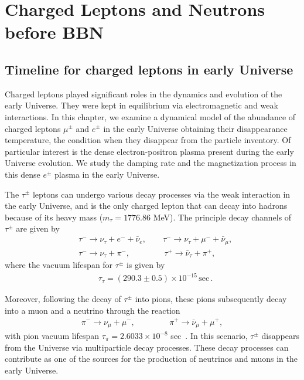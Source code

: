 \section{Charged Leptons and Neutrons before BBN} 
\subsection{Timeline for charged leptons in early Universe}\label{Electron}
Charged leptons played significant roles in the dynamics and evolution of the early Universe. They were kept in equilibrium via electromagnetic and weak interactions.  In this chapter, we examine a dynamical model of the abundance of charged leptons $\mu^\pm$ and $e^\pm$ in the early Universe obtaining their disappearance temperature, the condition when they disappear from the particle inventory. Of particular interest is the dense electron-positron plasma present during the early Universe evolution. We study the damping rate and the magnetization process in this dense $e^\pm$ plasma in the early Universe.

The $\tau^\pm$ leptons can undergo various decay processes via the weak interaction in the early Universe, and is the only charged lepton that can decay into hadrons because of its heavy mass ($m_\tau=1776.86$ MeV). The principle decay channels of $\tau^\pm$ are given by
\begin{align}
&\tau^-\rightarrow\nu_\tau+e^-+\bar{\nu}_e,\qquad \tau^-\rightarrow\nu_\tau+\mu^-+\bar{\nu}_\mu,\\
&\tau^-\rightarrow\nu_\tau+\pi^-,\qquad\qquad\,\tau^+\rightarrow\bar{\nu}_\tau+\pi^+,
\end{align}
 where the vacuum lifespan for $\tau^\pm$ is given by ~\cite{ParticleDataGroup:2022pth}
\begin{align}
&\tau_{\tau}=(290.3\pm0.5)\times10^{-15}\,\mathrm{sec}\,.
\end{align}

Moreover, following the decay of $\tau^\pm$ into pions, these pions subsequently decay into a muon and a neutrino through the reaction
\begin{align}
\pi^-\rightarrow\nu_\mu+\mu^-,\qquad\qquad\,\pi^+\rightarrow\bar{\nu}_\mu+\mu^+,
\end{align}
with pion vacuum lifespan $\tau_\pi=2.6033\times10^{-8}$ sec~\cite{ParticleDataGroup:2022pth}.
In this scenario, $\tau^\pm$ disappears from the Universe via multiparticle decay processes.
These decay processes can contribute as one of the sources for the production of neutrinos and muons in the early Universe.

